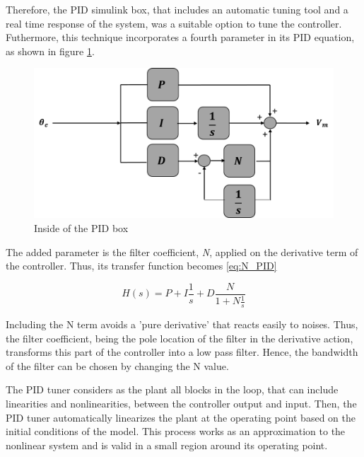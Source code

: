 Therefore, the PID simulink box, that includes an automatic tuning tool and a real time response of the system, was a suitable option to tune the controller. Futhermore, this technique incorporates a fourth parameter in its PID equation, as shown in figure \ref{PID_box_N}. 
 
\begin{figure}[H]
\centering
\includegraphics[scale=0.4]{figures/controller_box.png}
\caption{Inside of the PID box}
\label{PID_box_N}
\end{figure}

The added parameter is the filter coefficient, \textit{N}, applied on the derivative term of the controller. Thus, its transfer function becomes \ref{eq:N_PID}

\begin{equation}\label{eq:N_PID}
H(s) = P + I\frac{1}{s} + D\frac{N}{1+N\frac{1}{s}}
\end{equation}

Including the N term avoids a 'pure derivative' that reacts easily to noises. Thus, the filter coefficient, being the pole location of the filter in the derivative action, transforms this part of the controller into a low pass filter. Hence, the bandwidth of the filter can be chosen by changing the N value.\par

\vspace{5mm}


The PID tuner considers as the plant all blocks in the loop, that can include linearities and nonlinearities, between the controller output and input. Then, the PID tuner automatically linearizes the plant at the operating point based on the initial conditions of the model. This process works as an approximation to the nonlinear system and is valid in a small region around its operating point.\par

